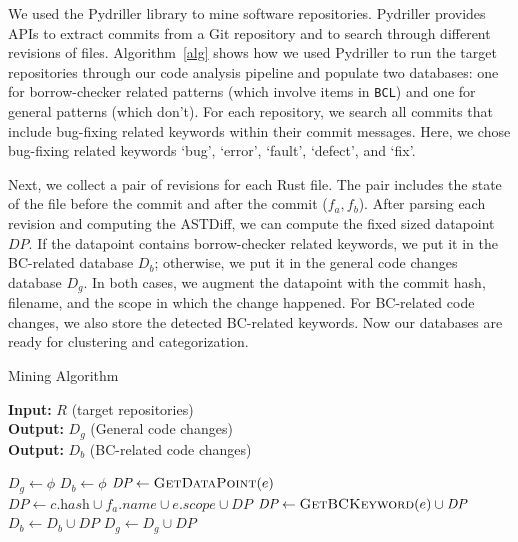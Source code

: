 We used the Pydriller library to mine software repositories. Pydriller provides APIs to extract commits from a Git repository and to search through different revisions of files. Algorithm~\ref{alg} shows how we used Pydriller to run the target repositories through our code analysis pipeline and populate two databases: one for borrow-checker related patterns (which involve items in \texttt{BCL}) and one for general patterns (which don't). For each repository, we search all commits that include bug-fixing related keywords within their commit messages. Here, we chose bug-fixing related keywords `bug', `error', `fault', `defect', and `fix'. 

Next, we collect a pair of revisions for each Rust file. The pair includes the state of the file before the commit and after the commit ($f_a, f_b$). After parsing each revision and computing the ASTDiff, we can compute the fixed sized datapoint $\mathit{DP}$. If the datapoint contains borrow-checker related keywords, we put it in the BC-related database $D_b$; otherwise, we put it in the general code changes database $D_g$. In both cases, we augment the datapoint with the commit hash, filename, and the scope in which the change happened. For BC-related code changes, we also store the detected BC-related keywords. Now our databases are ready for clustering and categorization.

\begin{algorithm}
\caption{\label{alg} Mining Algorithm}
\hspace*{2mm} \textbf{Input:} $R$ (target repositories)  \\
\hspace*{2mm} \textbf{Output:} $D_g$ (General code changes) \\
\hspace*{2mm} \textbf{Output:} $D_b$ (BC-related code changes)
\begin{algorithmic}
\State $D_g \leftarrow \phi$
\State $D_b \leftarrow \phi$
                    \State $\textit{DP} \leftarrow \textsc{GetDataPoint}(e)$
                    \State $\textit{DP} \leftarrow c.\textit{hash} \cup f_a.\textit{name} \cup e.\textit{scope} \cup \textit{DP} $
                        \State $\textit{DP} \leftarrow \textsc{GetBCKeyword}(e) \cup \textit{DP} $
                        \State $D_b \leftarrow D_b \cup \textit{DP}$
                    \Else
                        \State $D_g \leftarrow D_g \cup \textit{DP}$
                    \EndIf
                \EndFor
            \EndFor
        \EndIf
    \EndFor
\EndFor
\end{algorithmic}
\end{algorithm}

